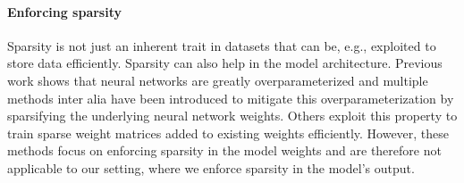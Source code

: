 \paragraph{Enforcing sparsity} Sparsity is not just an inherent trait in datasets that can be, e.g., exploited to store data efficiently. Sparsity can also help in the model architecture. Previous work \citep{Han:2015,Ullrich:2017} shows that neural networks are greatly overparameterized and multiple methods \citep{Molchanov:2017,Louizos:2018,Sun:2024,Lee:2018} inter alia have been introduced to mitigate this overparameterization by sparsifying the underlying neural network weights. Others \citep{Hu:2022} exploit this property to train sparse weight matrices added to existing weights efficiently. However, these methods focus on enforcing sparsity in the model weights and are therefore not applicable to our setting, where we enforce sparsity in the model's output.